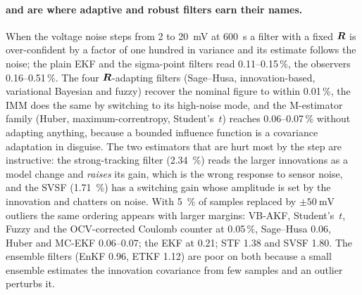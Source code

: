 \paragraph{ and  are where adaptive and robust filters earn their names.}
When the voltage noise steps from \SI{2}{} to \SI{20}{\milli\volt} at \SI{600}{\second} a filter
with a fixed $\bm{R}$ is over-confident by a factor of one hundred in variance and its estimate
follows the noise; the plain EKF and the sigma-point filters read \num{0.11}--\num{0.15}\,\%, the
observers \num{0.16}--\num{0.51}\,\%. The four $\bm{R}$-adapting filters (Sage--Husa, innovation-based,
variational Bayesian and fuzzy) recover the nominal figure to within \num{0.01}\,\%, the IMM
does the same by switching to its high-noise mode, and the M-estimator family (Huber,
maximum-correntropy, Student's~$t$) reaches \num{0.06}--\num{0.07}\,\% without adapting anything,
because a bounded influence function is a covariance adaptation in disguise. The two estimators
that are hurt most by the step are instructive: the strong-tracking filter (\SI{2.34}{\percent})
reads the larger innovations as a model change and \emph{raises} its gain, which is the wrong
response to sensor noise, and the SVSF (\SI{1.71}{\percent}) has a switching gain whose
amplitude is set by the innovation and chatters on noise. With \SI{5}{\percent} of samples
replaced by $\pm\SI{50}{\milli\volt}$ outliers the same ordering appears with larger
margins: VB-AKF, Student's~$t$, Fuzzy and the OCV-corrected Coulomb counter at
\num{0.05}\,\%, Sage--Husa \num{0.06}, Huber and MC-EKF \num{0.06}--\num{0.07}; the EKF at
\num{0.21}; STF \num{1.38} and SVSF \num{1.80}. The ensemble filters (EnKF \num{0.96}, ETKF
\num{1.12}) are poor on both because a small ensemble estimates the innovation covariance
from few samples and an outlier perturbs it.

